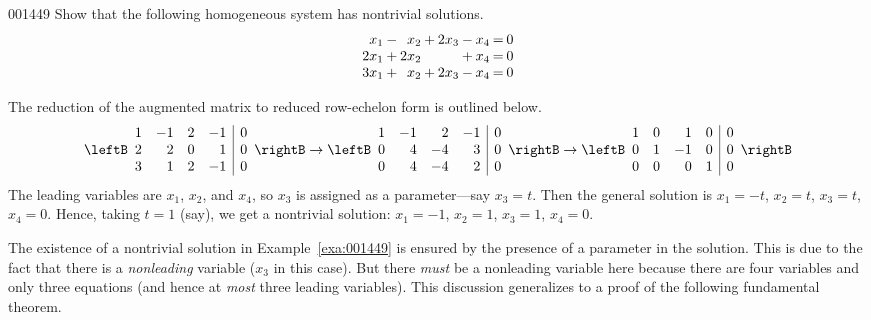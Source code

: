\begin{example}{}{001449}
Show that the following homogeneous system has nontrivial solutions.
\begin{equation*}
\arraycolsep=1pt
\begin{array}{rlrlrlrcr}
	 x_1 & - & x_2 & + & 2x_3 & -  & x_4 & = & 0 \\
	2x_1 & + &2x_2 &   &      & + & x_4 & = & 0 \\
	3x_1 & + & x_2 & + & 2x_3 & - & x_4 & = & 0   
\end{array}
\end{equation*}
\begin{solution}
The reduction of the augmented matrix to reduced row-echelon form is outlined below.
\begin{equation*}
\leftB \begin{array}{rrrr|r}
	1 & -1 & 2 & -1 & 0 \\
	2 & 2 & 0 &  1 & 0 \\
	3 & 1 & 2 &  -1 & 0
\end{array} \rightB
\rightarrow
\leftB \begin{array}{rrrr|r}
	1 & -1 & 2 & -1 & 0 \\
	0 & 4 & -4 & 3 & 0 \\
	0 & 4 & -4 & 2 & 0
\end{array} \rightB
\rightarrow
\leftB \begin{array}{rrrr|r}
	1 & 0 & 1 & 0 & 0 \\
	0 & 1 & -1 & 0 & 0 \\
	0 & 0 & 0 & 1 & 0
\end{array} \rightB
\end{equation*}
The leading variables are $x_1$, $x_2$, and $x_4$, so $x_3$ is assigned as a parameter---say $x_3 = t$. Then the general solution is $x_1 = -t$, $x_2 = t$, $x_3 = t$, $x_4 = 0$. Hence, taking $t = 1$ (say), we get a nontrivial solution: $x_1 = -1$, $x_2 = 1$, $x_3 = 1$, $x_4 = 0$.
\end{solution}
\end{example}

\noindent The existence of a nontrivial solution in Example~\ref{exa:001449} is ensured by the presence of a parameter in the solution. This is due to the fact that there is a \textit{nonleading} variable ($x_3$ in this case). But there \textit{must} be a nonleading variable here because there are four variables and only three equations (and hence at \textit{most} three leading variables). This discussion generalizes to a proof of the following fundamental theorem.

